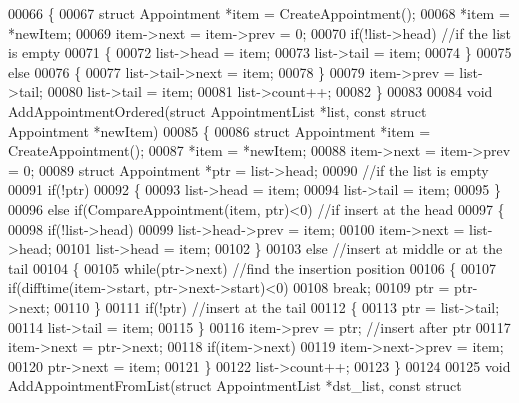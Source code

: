\begin{DoxyCode}
00066 \{
00067     \textcolor{keyword}{struct }Appointment *item = CreateAppointment();
00068     *item = *newItem;
00069     item->next = item->prev = 0;
00070     \textcolor{keywordflow}{if}(!list->head) \textcolor{comment}{//if the list is empty}
00071     \{
00072         list->head = item;
00073         list->tail = item;
00074     \}
00075     \textcolor{keywordflow}{else}
00076     \{
00077         list->tail->next = item;
00078     \}
00079     item->prev = list->tail;
00080     list->tail = item;
00081     list->count++;
00082 \}
00083 
00084 \textcolor{keywordtype}{void} AddAppointmentOrdered(\textcolor{keyword}{struct} AppointmentList *list, \textcolor{keyword}{const} \textcolor{keyword}{struct} 
      Appointment *newItem)
00085 \{
00086     \textcolor{keyword}{struct }Appointment *item = CreateAppointment();
00087     *item = *newItem;
00088     item->next = item->prev = 0;
00089     \textcolor{keyword}{struct }Appointment *ptr = list->head;
00090     \textcolor{comment}{//if the list is empty}
00091     \textcolor{keywordflow}{if}(!ptr)
00092     \{
00093         list->head = item;
00094         list->tail = item;
00095     \}
00096     \textcolor{keywordflow}{else} \textcolor{keywordflow}{if}(CompareAppointment(item, ptr)<0)    \textcolor{comment}{//if insert at the head}
00097     \{
00098         \textcolor{keywordflow}{if}(!list->head)
00099             list->head->prev = item;
00100         item->next = list->head;
00101         list->head = item;
00102     \}
00103     \textcolor{keywordflow}{else}    \textcolor{comment}{//insert at middle or at the tail}
00104     \{
00105         \textcolor{keywordflow}{while}(ptr->next)    \textcolor{comment}{//find the insertion position}
00106         \{
00107             \textcolor{keywordflow}{if}(difftime(item->start, ptr->next->start)<0)
00108                 \textcolor{keywordflow}{break};
00109             ptr = ptr->next;
00110         \}
00111         \textcolor{keywordflow}{if}(!ptr)    \textcolor{comment}{//insert at the tail}
00112         \{
00113             ptr = list->tail;
00114             list->tail = item;
00115         \}
00116         item->prev = ptr;   \textcolor{comment}{//insert after ptr}
00117         item->next = ptr->next;
00118         \textcolor{keywordflow}{if}(item->next)
00119             item->next->prev = item;
00120         ptr->next = item;
00121     \}
00122     list->count++;
00123 \}
00124 
00125 \textcolor{keywordtype}{void} AddAppointmentFromList(\textcolor{keyword}{struct} AppointmentList *dst\_list, \textcolor{keyword}{const} \textcolor{keyword}{struct} 

\end{DoxyCode}
